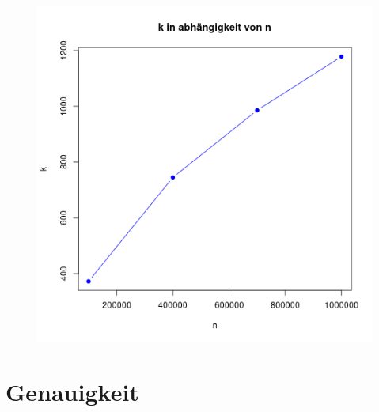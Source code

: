 \documentclass[course=erap]{aspdoc}
\begin{document}
\begin{figure}[h!]
\begin{minipage}{.5\textwidth}
        \label{fig:test1}
    \end{minipage}%
    \begin{minipage}{.5\textwidth}
        \centering
        \includegraphics[width=.9\linewidth]{graphs/sndgraph.png}

        \label{fig:test2}
    \end{minipage}
\end{figure}
\section{Genauigkeit}
\end{document}
